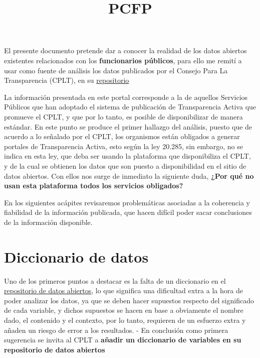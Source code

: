 \documentclass[11pt]{article}
\title{PCFP}
\begin{document}
    
    \maketitle
    
    

    
    El presente documento pretende dar a conocer la realidad de los datos
abiertos existentes relacionados con los \textbf{funcionarios públicos},
para ello me remití a usar como fuente de análisis los datos publicados
por el Consejo Para La Transparencia (CPLT), en su
\href{https://www.portaltransparencia.cl/PortalPdT/web/guest/opendata}{repositorio}

La información presentada en este portal corresponde a la de aquellos
Servicios Públicos que han adoptado el sistema de publicación de
Transparencia Activa que promueve el CPLT, y que por lo tanto, es
posible de disponibilizar de manera estándar. En este punto se produce
el primer hallazgo del análisis, puesto que de acuerdo a lo señalado por
el CPLT, los organismos están obligados a generar portales de
Transparencia Activa, esto según la ley 20.285, sin embargo, no se
indica en esta ley, que deba ser usando la plataforma que disponibiliza
el CPLT, y de la cual se obtienen los datos que son puesto a
disponibilidad en el sitio de datos abiertos. Con ellos nos surge de
inmediato la siguiente duda, \textbf{¿Por qué no usan esta plataforma
todos los servicios obligados?}

En los siguientes acápites revisaremos problemáticas asociadas a la
coherencia y fiabilidad de la información publicada, que hacen difícil
poder sacar conclusiones de la información disponible.

    \hypertarget{diccionario-de-datos}{%
\section{Diccionario de datos}\label{diccionario-de-datos}}

Uno de los primeros puntos a destacar es la falta de un diccionario en
el
\href{https://www.portaltransparencia.cl/PortalPdT/web/guest/opendata}{repositorio
de datos abiertos}, lo que significa una dificultad extra a la hora de
poder analizar los datos, ya que se deben hacer supuestos respecto del
significado de cada variable, y dichos supuestos se hacen en base a
obviamente el nombre dado, el contenido y el contexto, por lo tanto,
requieren de un esfuerzo extra y añaden un riesgo de error a los
resultados. - En conclusión como primera sugerencia se invita al CPLT a
\textbf{añadir un diccionario de variables en su repositorio de datos
abiertos}
\end{document}
